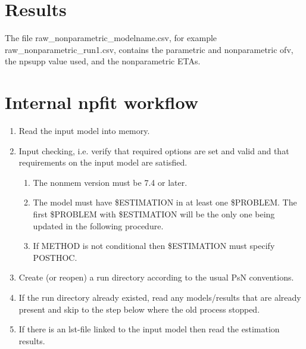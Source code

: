 \section{Results}

The file raw\_nonparametric\_modelname.csv, for example raw\_nonparametric\_run1.csv,
contains the parametric and nonparametric ofv, the npsupp value used,
and the nonparametric ETAs.

\section{Internal npfit workflow}

\begin{enumerate}
\item Read the input model into memory. %
\item Input checking, i.e. verify that required options are set and valid and that requirements on the input model
are satisfied.%
\begin{enumerate}
\item The nonmem version must be 7.4 or later.
\item The model must have \$ESTIMATION in at least one \$PROBLEM. The first \$PROBLEM with \$ESTIMATION will be the
only one being updated in the following procedure.
\item If METHOD is not conditional then \$ESTIMATION must specify POSTHOC.
\end{enumerate}
\item Create (or reopen) a run directory according to the usual PsN conventions.
\item If the run directory already existed, read any models/results that are already present and skip
to the step below where the old process stopped. %
\item If there is an lst-file linked to the input model then read the estimation results. %

\end{enumerate}
